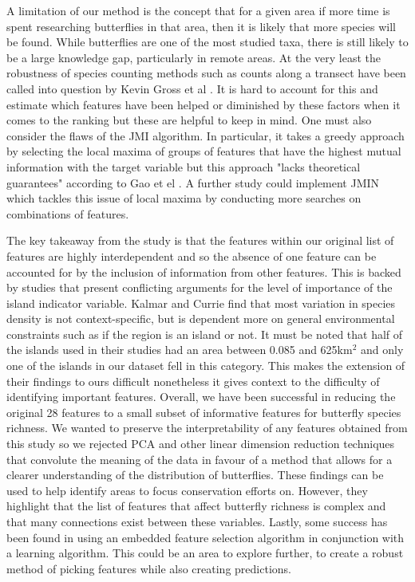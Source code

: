 \documentclass[prl,showpacs,superscriptaddress,twocolumn,longbibliography]{revtex4-1}
\begin{document}
\newline
\newline
A limitation of our method is the concept that for a given area if more time is spent researching butterflies in that area, then it is likely that more species will be found. While butterflies are one of the most studied taxa, there is still likely to be a large knowledge gap, particularly in remote areas. At the very least the robustness of species counting methods such as counts along a transect have been called into question by Kevin Gross et al \cite{gross_robustness_2007}. It is hard to account for this and estimate which features have been helped or diminished by these factors when it comes to the ranking but these are helpful to keep in mind.  
\newline
\newline
One must also consider the flaws of the JMI algorithm. In particular, it takes a greedy approach by selecting the local maxima of groups of features that have the highest mutual information with the target variable but this approach "lacks theoretical guarantees" according to Gao et el \cite{gao_variational_2016}. A further study could implement JMIN which tackles this issue of local maxima by conducting more searches on combinations of features.


The key takeaway from the study is that the features within our original list of features are highly interdependent and so the absence of one feature can be accounted for by the inclusion of information from other features. This is backed by studies that present conflicting arguments for the level of importance of the island indicator variable\cite{kalmar_unified_2007}. Kalmar and Currie find that most variation in species density is not context-specific, but is dependent more on general environmental constraints such as if the region is an island or not. It must be noted that half of the islands used in their studies had an area between 0.085 and 625km$^2$ and only one of the islands in our dataset fell in this category. This makes the extension of their findings to ours difficult nonetheless it gives context to the difficulty of identifying important features.
\newline
\newline
Overall, we have been successful in reducing the original 28 features to a small subset of informative features for butterfly species richness. We wanted to preserve the interpretability of any features obtained from this study so we rejected PCA and other linear dimension reduction techniques that convolute the meaning of the data in favour of a method that allows for a clearer understanding of the distribution of butterflies. These findings can be used to help identify areas to focus conservation efforts on. However, they highlight that the list of features that affect butterfly richness is complex and that many connections exist between these variables. Lastly, some success has been found in using an embedded feature selection algorithm in conjunction with a learning algorithm. This could be an area to explore further, to create a robust method of picking features while also creating predictions.




\end{document}
